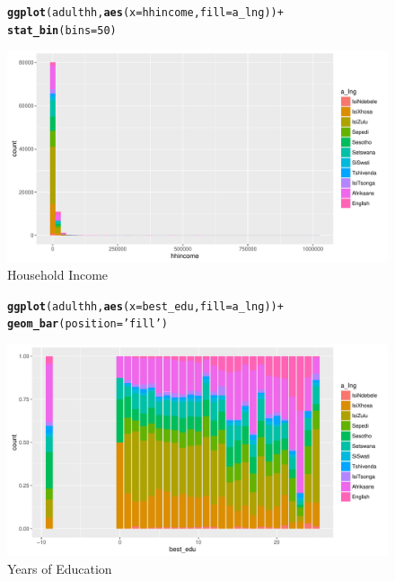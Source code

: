 \documentclass[a4paper,british]{article}\usepackage[]{graphicx}\usepackage[]{color}
\makeatletter
\def\maxwidth{ %
  \ifdim\Gin@nat@width>\linewidth
    \linewidth
  \else
    \Gin@nat@width
  \fi
}
\newcommand{\hlnum}[1]{\textcolor[rgb]{0.686,0.059,0.569}{#1}}%
\newcommand{\hlstr}[1]{\textcolor[rgb]{0.192,0.494,0.8}{#1}}%
\newcommand{\hlopt}[1]{\textcolor[rgb]{0,0,0}{#1}}%
\newcommand{\hlstd}[1]{\textcolor[rgb]{0.345,0.345,0.345}{#1}}%
\newcommand{\hlkwc}[1]{\textcolor[rgb]{0.333,0.667,0.333}{#1}}%
\newcommand{\hlkwd}[1]{\textcolor[rgb]{0.737,0.353,0.396}{\textbf{#1}}}%
\newenvironment{kframe}{%
 \def\at@end@of@kframe{}%
 \ifinner\ifhmode%
  \def\at@end@of@kframe{\end{minipage}}%
  \begin{minipage}{\columnwidth}%
 \fi\fi%
 \def\FrameCommand##1{\hskip\@totalleftmargin \hskip-\fboxsep
 \colorbox{shadecolor}{##1}\hskip-\fboxsep
     \hskip-\linewidth \hskip-\@totalleftmargin \hskip\columnwidth}%
 \MakeFramed {\advance\hsize-\width
   \@totalleftmargin\z@ \linewidth\hsize
   \@setminipage}}%
 {\par\unskip\endMakeFramed%
 \at@end@of@kframe}
\newenvironment{knitrout}{}{} %
\makeatother
\begin{document}
\begin{figure}[H]
\caption{Household Income}

\label{fig:hhincome}

\begin{knitrout}
\color{fgcolor}\begin{kframe}
\begin{alltt}
\hlkwd{ggplot}\hlstd{(adulthh,} \hlkwd{aes}\hlstd{(}\hlkwc{x}\hlstd{=hhincome,} \hlkwc{fill}\hlstd{=a_lng ))} \hlopt{+}
    \hlkwd{stat_bin}\hlstd{(}\hlkwc{bins}\hlstd{=}\hlnum{50}\hlstd{)}
\end{alltt}
\end{kframe}
\includegraphics[width=\maxwidth]{../misc/latex-hhincome-1} 

\end{knitrout}
\end{figure}

\begin{figure}[H]
\caption{Years of Education}

\label{fig:bestedu}

\begin{knitrout}
\color{fgcolor}\begin{kframe}
\begin{alltt}
\hlkwd{ggplot}\hlstd{(adulthh,} \hlkwd{aes}\hlstd{(}\hlkwc{x}\hlstd{=best_edu,} \hlkwc{fill}\hlstd{=a_lng ))} \hlopt{+}
    \hlkwd{geom_bar}\hlstd{(}\hlkwc{position} \hlstd{=} \hlstr{'fill'}\hlstd{)}
\end{alltt}
\end{kframe}
\includegraphics[width=\maxwidth]{../misc/latex-best_edu-1} 

\end{knitrout}
\end{figure}
\end{document}
